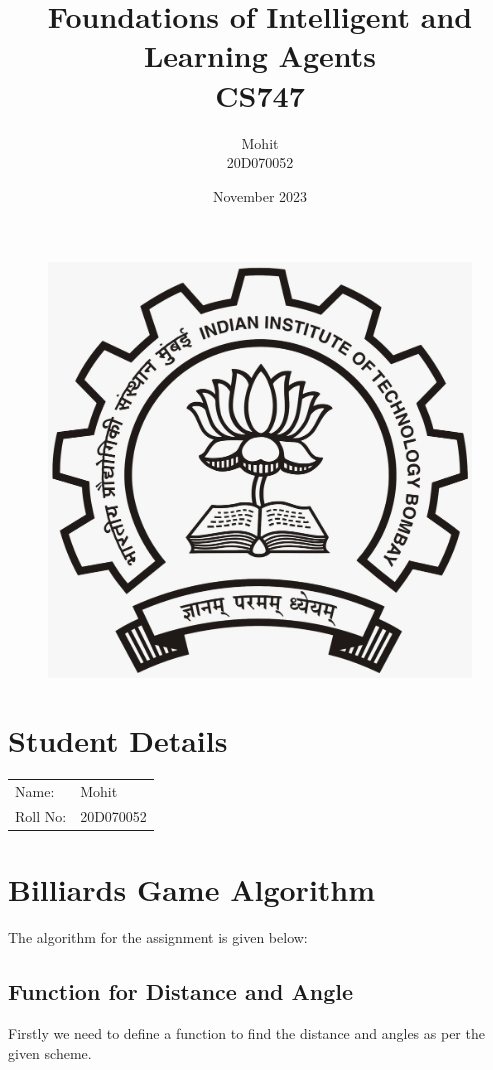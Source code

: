 \documentclass{article}
\title{Foundations of Intelligent and Learning Agents\\CS747}
\author{Mohit\\20D070052 }
\date{November 2023}
\begin{document}
\maketitle
\begin{figure}[H]
\begin{center}
\includegraphics[scale = 0.2]{LOGO.jpeg}
\end{center}
\end{figure}
\section{Student Details}
\begin{tabular}{ l l  }
 Name: & Mohit \\ 
 Roll No: & 20D070052  \\  
\end{tabular}

\newpage



\section{Billiards Game Algorithm}
The algorithm for the assignment is given below:

\subsection{Function for Distance and Angle}
Firstly we need to define a function to find the distance and angles as per the given scheme. \\
\end{document}
